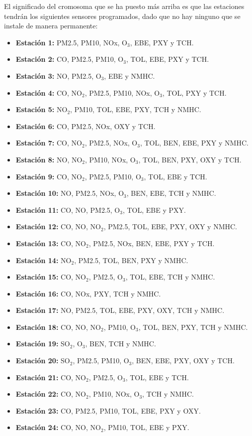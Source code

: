 \documentclass[12pt, spanish, pdftex]{UC3M_document}
\begin{document}
El significado del cromosoma que se ha puesto más arriba es que las estaciones tendrán los siguientes sensores programados, dado que no hay ninguno que se instale de manera permanente:
\begin{itemize}
	\item \textbf{Estación 1:} PM2.5, PM10, NOx, O$_3$, EBE, PXY y TCH.
	\item \textbf{Estación 2:} CO, PM2.5, PM10, O$_3$, TOL, EBE, PXY y TCH.
	\item \textbf{Estación 3:} NO, PM2.5, O$_3$, EBE y NMHC.
	\item \textbf{Estación 4:} CO, NO$_2$, PM2.5, PM10, NOx, O$_3$, TOL, PXY y TCH.
	\item \textbf{Estación 5:} NO$_2$, PM10, TOL, EBE, PXY, TCH y NMHC.
	\item \textbf{Estación 6:} CO, PM2.5, NOx, OXY y TCH.
	\item \textbf{Estación 7:} CO, NO$_2$, PM2.5, NOx, O$_3$, TOL, BEN, EBE, PXY y NMHC.
	\item \textbf{Estación 8:} NO, NO$_2$, PM10, NOx, O$_3$, TOL, BEN, PXY, OXY y TCH.
	\item \textbf{Estación 9:} CO, NO$_2$, PM2.5, PM10, O$_3$, TOL, EBE y TCH.
	\item \textbf{Estación 10:} NO, PM2.5, NOx, O$_3$, BEN, EBE, TCH y NMHC.
	\item \textbf{Estación 11:} CO, NO, PM2.5, O$_3$, TOL, EBE y PXY.
	\item \textbf{Estación 12:} CO, NO, NO$_2$, PM2.5, TOL, EBE, PXY, OXY y NMHC.
	\item \textbf{Estación 13:} CO, NO$_2$, PM2.5, NOx, BEN, EBE, PXY y TCH.
	\item \textbf{Estación 14:} NO$_2$, PM2.5, TOL, BEN, PXY y NMHC.
	\item \textbf{Estación 15:} CO, NO$_2$, PM2.5, O$_3$, TOL, EBE, TCH y NMHC.
	\item \textbf{Estación 16:} CO, NOx, PXY, TCH y NMHC.
	\item \textbf{Estación 17:} NO, PM2.5, TOL, EBE, PXY, OXY, TCH y NMHC.
	\item \textbf{Estación 18:} CO, NO, NO$_2$, PM10, O$_3$, TOL, BEN, PXY, TCH y NMHC.
	\item \textbf{Estación 19:} SO$_2$, O$_3$, BEN, TCH y NMHC.
	\item \textbf{Estación 20:} SO$_2$, PM2.5, PM10, O$_3$, BEN, EBE, PXY, OXY y TCH.
	\item \textbf{Estación 21:} CO, NO$_2$, PM2.5, O$_3$, TOL, EBE y TCH.
	\item \textbf{Estación 22:} CO, NO$_2$, PM10, NOx, O$_3$, TCH y NMHC.
	\item \textbf{Estación 23:} CO, PM2.5, PM10, TOL, EBE, PXY y OXY.
	\item \textbf{Estación 24:} CO, NO, NO$_2$, PM10, TOL, EBE y PXY.
\end{itemize}
\end{document}
